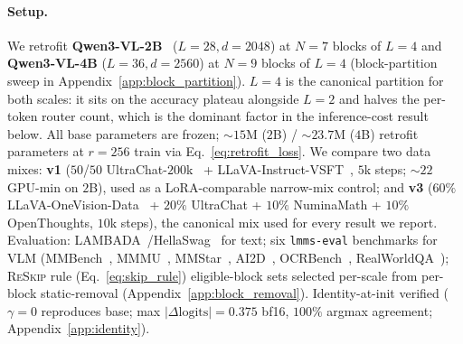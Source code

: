 \documentclass{article}
\newcommand{\reskip}{\textsc{ReSkip}}
\begin{document}
\paragraph{Setup.}
We retrofit \textbf{Qwen3-VL-2B}~\citep{bai2025qwen3vl} ($L{=}28, d{=}2048$) at $N{=}7$ blocks of $L{=}4$ and \textbf{Qwen3-VL-4B} ($L{=}36, d{=}2560$) at $N{=}9$ blocks of $L{=}4$ (block-partition sweep in Appendix~\ref{app:block_partition}). $L{=}4$ is the canonical partition for both scales: it sits on the accuracy plateau alongside $L{=}2$ and halves the per-token router count, which is the dominant factor in the inference-cost result below. All base parameters are frozen; $\sim$$15$M ($2$B) / $\sim$$23.7$M ($4$B) retrofit parameters at $r{=}256$ train via Eq.~\ref{eq:retrofit_loss}. We compare two data mixes: \textbf{v1} ($50$/$50$ UltraChat-$200$k~\citep{ding2023ultrachat} + LLaVA-Instruct-VSFT~\citep{liu2023llava}, $5$k steps; $\sim$$22$ GPU-min on $2$B), used as a LoRA-comparable narrow-mix control; and \textbf{v3} ($60\%$ LLaVA-OneVision-Data~\citep{li2024llavaonevision} + $20\%$ UltraChat + $10\%$ NuminaMath + $10\%$ OpenThoughts, $10$k steps), the canonical mix used for every result we report. Evaluation: LAMBADA~\citep{paperno2016lambada}/HellaSwag~\citep{zellers2019hellaswag} for text; six \texttt{lmms-eval} benchmarks for VLM (MMBench~\citep{liu2023mmbench}, MMMU~\citep{yue2024mmmu}, MMStar~\citep{chen2024mmstar}, AI2D~\citep{kembhavi2016ai2d}, OCRBench~\citep{liu2024ocrbench}, RealWorldQA~\citep{grok2024realworldqa}); \reskip{} rule (Eq.~\ref{eq:skip_rule}) eligible-block sets selected per-scale from per-block static-removal (Appendix~\ref{app:block_removal}). Identity-at-init verified ($\gamma{=}0$ reproduces base; max $|\Delta\text{logits}|=0.375$ bf16, $100\%$ argmax agreement; Appendix~\ref{app:identity}).
\end{document}
